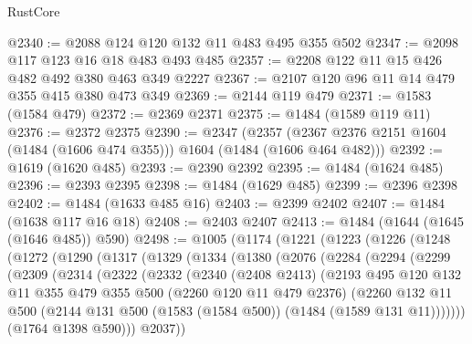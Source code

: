 \begin{lexlean}{RustCore}
\begin{coremodule}
@2340 := @2088 @124 @120 @132 @11 @483 @495 @355 @502
@2347 := @2098 @117 @123 @16 @18 @483 @493 @485
@2357 := @2208 @122 @11 @15 @426 @482 @492 @380 @463 @349 @2227
@2367 := @2107 @120 @96 @11 @14 @479 @355 @415 @380 @473 @349
@2369 := @2144 @119 @479
@2371 := @1583 (@1584 @479)
@2372 := @2369 @2371
@2375 := @1484 (@1589 @119 @11)
@2376 := @2372 @2375
@2390 := @2347
    (@2357 (@2367 @2376 @2151 @1604 (@1484 (@1606 @474 @355))) @1604 (@1484 (@1606 @464 @482)))
@2392 := @1619 (@1620 @485)
@2393 := @2390 @2392
@2395 := @1484 (@1624 @485)
@2396 := @2393 @2395
@2398 := @1484 (@1629 @485)
@2399 := @2396 @2398
@2402 := @1484 (@1633 @485 @16)
@2403 := @2399 @2402
@2407 := @1484 (@1638 @117 @16 @18)
@2408 := @2403 @2407
@2413 := @1484 (@1644 (@1645 (@1646 @485)) @590)
@2498 := @1005
    (@1174
      (@1221
        (@1223
          (@1226
            (@1248
              (@1272
                (@1290
                  (@1317
                    (@1329
                      (@1334
                        (@1380
                          (@2076
                            (@2284
                              (@2294
                                (@2299
                                  (@2309
                                    (@2314
                                      (@2322
                                        (@2332
                                          (@2340
                                            (@2408 @2413)
                                            (@2193
                                              @495
                                              @120
                                              @132
                                              @11
                                              @355
                                              @479
                                              @355
                                              @500
                                              (@2260 @120 @11 @479 @2376)
                                              (@2260
                                                @132
                                                @11
                                                @500
                                                (@2144
                                                  @131
                                                  @500
                                                  (@1583 (@1584 @500))
                                                  (@1484 (@1589 @131 @11)))))))
                                        (@1764 @1398 @590)))
                                    @2037))

\end{coremodule}
\end{lexlean}

